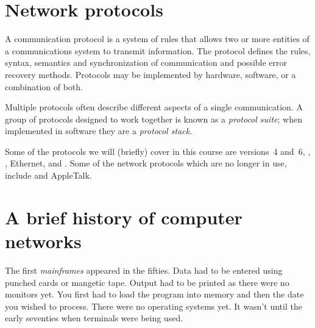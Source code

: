 


\section{Network protocols}

A communication protocol is a system of rules that allows two or more entities of a communications system to transmit information.
The protocol defines the rules, syntax, semantics and synchronization of communication and possible error recovery methods.
Protocols may be implemented by hardware, software, or a combination of both.

Multiple protocols often describe different aspects of a single communication.
A group of protocols designed to work together is known as a \emph{protocol suite}; when implemented in software they are a \emph{protocol stack}.

Some of the protocols we will (briefly) cover in this course are  versions~4 and~6, , , Ethernet, and .
Some of the network protocols which are no longer in use, include  and AppleTalk.



\section{A brief history of computer networks}

The first \emph{mainframes} appeared in the fifties.
Data had to be entered using punched cards or mangetic tape.
Output had to be printed as there were no monitors yet.
You first had to load the program into memory and then the date you wished to process.
There were no operating systems yet.
It wasn't until the early seventies when terminals were being used.

